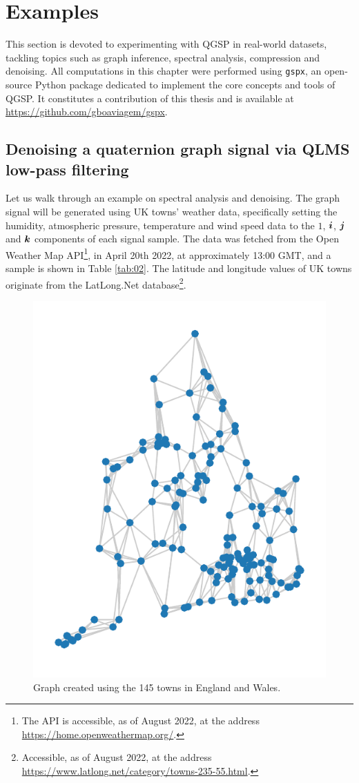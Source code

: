 \section{Examples}

This section is devoted to experimenting with QGSP in real-world datasets, tackling topics such as graph inference, spectral analysis, compression and denoising. All computations in this chapter were performed using \texttt{gspx}, an open-source Python package dedicated to implement the core concepts and tools of QGSP. It constitutes a contribution of this thesis and is available at \url{https://github.com/gboaviagem/gspx}.

\subsection{Denoising a quaternion graph signal via QLMS low-pass filtering}
\label{subsec:denoising}

Let us walk through an example on spectral analysis and denoising. The graph signal will be generated using UK towns' weather data, specifically setting the humidity, atmospheric pressure, temperature and wind speed data to the $1$, $\boldsymbol{i}$, $\boldsymbol{j}$ and $\boldsymbol{k}$ components of each signal sample. The data was fetched from the Open Weather Map API\footnote{The API is accessible, as of August 2022, at the address \url{https://home.openweathermap.org/}.}, in April 20th 2022, at approximately 13:00 GMT, and a sample is shown in Table \ref{tab:02}. The latitude and longitude values of UK towns originate from the LatLong.Net database\footnote{Accessible, as of August 2022, at the address \url{https://www.latlong.net/category/towns-235-55.html}.}.

\begin{figure}
\centering
\includegraphics[width=0.3\linewidth]{thesis/Figures/uk_example/uk_graph.pdf}
\caption{Graph created using the 145 towns in England and Wales.}
\label{fig:uk_graph}
\end{figure}

